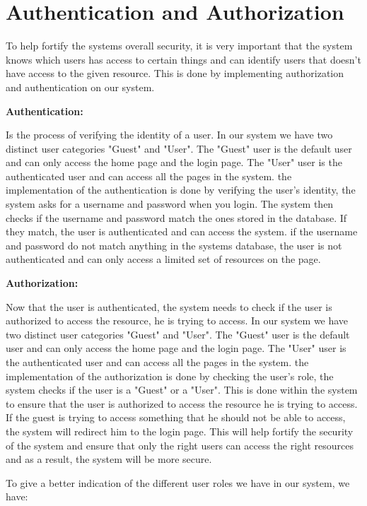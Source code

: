 \section{Authentication and Authorization}

To help fortify the systems overall security, it is very
important that the system knows which users has
access to certain things and can identify users that doesn't have
access to the given resource. This is done by implementing authorization
and authentication on our system.

\textbf{Authentication:} 

Is the process of verifying the
identity of a user. In our system we have two distinct
user categories "Guest" and "User". The "Guest" user
is the default user and can only access the home
page and the login page. The "User" user is the
authenticated user and can access all the pages in
the system.
the implementation of the authentication is done by
verifying the user's identity, the system asks for a
username and password when you login. The system
then checks if the username and password match the
ones stored in the database. If they match, the user
is authenticated and can access the system. if the
username and password do not match anything in
the systems database, the user is not authenticated
and can only access a limited set of resources on the
page. \newline

\textbf{Authorization:} 

Now that the user is authenticated,
the system needs to check if the user is authorized
to access the resource, he is trying to access. In
our system we have two distinct user categories
"Guest" and "User". The "Guest" user is the default
user and can only access the home page and the
login page. The "User" user is the authenticated
user and can access all the pages in the system.
the implementation of the authorization is done by
checking the user's role, the system checks if the
user is a "Guest" or a "User". This is done within
the system to ensure that the user is authorized to
access the resource he is trying to access. If the
guest is trying to access something that he should
not be able to access, the system will redirect him to
the login page. This will help fortify the security of
the system and ensure that only the right users can
access the right resources and as a result, the system
will be more secure.

To give a better indication of the different user roles we have in our system, we have:


